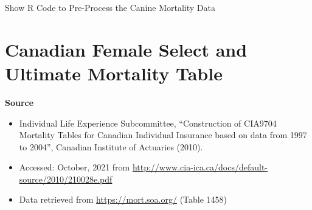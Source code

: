 \documentclass[
]{book}
\newenvironment{Shaded}{\begin{snugshade}}{\end{snugshade}}
\newcommand{\CommentTok}[1]{\textcolor[rgb]{0.56,0.35,0.01}{\textit{#1}}}
\newcommand{\DecValTok}[1]{\textcolor[rgb]{0.00,0.00,0.81}{#1}}
\newcommand{\FloatTok}[1]{\textcolor[rgb]{0.00,0.00,0.81}{#1}}
\newcommand{\KeywordTok}[1]{\textcolor[rgb]{0.13,0.29,0.53}{\textbf{#1}}}
\newcommand{\NormalTok}[1]{#1}
\newcommand{\OperatorTok}[1]{\textcolor[rgb]{0.81,0.36,0.00}{\textbf{#1}}}
\newcommand{\StringTok}[1]{\textcolor[rgb]{0.31,0.60,0.02}{#1}}
\providecommand{\tightlist}{%
  \setlength{\itemsep}{0pt}\setlength{\parskip}{0pt}}
\begin{document}
Show R Code to Pre-Process the Canine Mortality Data

\hypertarget{toggleCode.DataDict.1}{}
\begin{Shaded}
\end{Shaded}

\hypertarget{Sec:CanadianSelect}{%
\section{Canadian Female Select and Ultimate Mortality Table}\label{Sec:CanadianSelect}}

\textbf{Source}

\begin{itemize}
\tightlist
\item
  Individual Life Experience Subcommittee, ``Construction of CIA9704 Mortality Tables for Canadian Individual Insurance based on data from 1997 to 2004'', Canadian Institute of Actuaries (2010).
\item
  Accessed: October, 2021 from \url{http://www.cia-ica.ca/docs/default-source/2010/210028e.pdf}
\item
  Data retrieved from \url{https://mort.soa.org/} (Table 1458)
\end{itemize}
\end{document}
